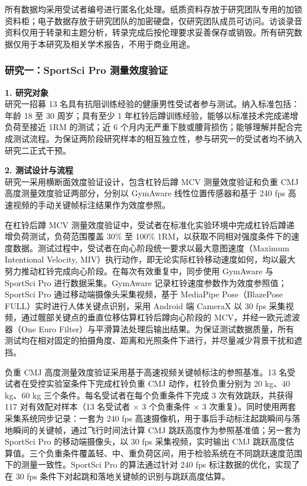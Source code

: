 \documentclass[UTF8,zihao=-4,twoside,openany]{ctexbook}
\begin{document}
所有数据均采用受试者编号进行匿名化处理。纸质资料存放于研究团队专用的加锁资料柜；电子数据存放于研究团队的加密硬盘，仅研究团队成员可访问。访谈录音资料仅用于转录和主题分析，转录完成后按伦理要求妥善保存或销毁。所有研究数据仅用于本研究及相关学术报告，不用于商业用途。

\subsubsection{研究一：SportSci Pro 测量效度验证}
\noindent \textbf{1. 研究对象} \\
研究一招募 13 名具有抗阻训练经验的健康男性受试者参与测试。纳入标准包括：年龄 18 至 30 周岁；具有至少 1 年杠铃后蹲训练经验，能够以标准技术完成递增负荷至接近 1RM 的测试；近 6 个月内无严重下肢或腰背损伤；能够理解并配合完成测试流程。为保证两阶段研究样本的相互独立性，参与研究一的受试者均不纳入研究二正式干预。

\vspace{0.2cm}
\noindent \textbf{2. 测试设计与流程} \\
研究一采用横断面效度验证设计，包含杠铃后蹲 MCV 测量效度验证和负重 CMJ 高度测量效度验证两部分，分别以 GymAware 线性位置传感器和基于 240 fps 高速视频的手动关键帧标注结果作为效度参照。

在杠铃后蹲 MCV 测量效度验证中，受试者在标准化实验环境中完成杠铃后蹲递增负荷测试，负荷范围覆盖 30\% 至 100\% 1RM，以获取不同相对强度条件下的速度数据。测试过程中，受试者在向心阶段统一要求以最大意图速度（Maximum Intentional Velocity, MIV）执行动作，即无论实际杠铃移动速度如何，均以最大努力推动杠铃完成向心阶段。在每次有效重复中，同步使用 GymAware 与 SportSci Pro 进行数据采集。GymAware 记录杠铃速度参数作为效度参照值；SportSci Pro 通过移动端摄像头采集视频，基于 MediaPipe Pose（BlazePose FULL）实时进行人体关键点识别，采用 Android 端 CameraX 以 30 fps 采集视频，通过髋部关键点的垂直位移估算杠铃后蹲向心阶段的 MCV，并经一欧元滤波器（One Euro Filter）与平滑算法处理后输出结果。为保证测试数据质量，所有测试均在相对固定的拍摄角度、距离和光照条件下进行，并尽量减少背景干扰和遮挡。

负重 CMJ 高度测量效度验证采用基于高速视频关键帧标注的参照基准。13 名受试者在受控实验室条件下完成杠铃负重 CMJ 动作，杠铃负重分别为 20 kg、40 kg、60 kg 三个条件。每名受试者在每个负重条件下完成 3 次有效跳跃，共获得 117 对有效配对样本（13 名受试者 $\times$ 3 个负重条件 $\times$ 3 次重复）。同时使用两套采集系统同步记录：一套为 240 fps 高速摄像机，用于事后手动标注起跳瞬间与落地瞬间的关键帧，通过飞行时间法计算 CMJ 跳跃高度作为参照基准值；另一套为 SportSci Pro 的移动端摄像头，以 30 fps 采集视频，实时输出 CMJ 跳跃高度估算值。三个负重条件覆盖轻、中、重负荷区间，用于检验系统在不同跳跃速度范围下的测量一致性。SportSci Pro 的算法通过针对 240 fps 标注数据的优化，实现了在 30 fps 条件下对起跳和落地关键帧的识别与跳跃高度估算。
\end{document}
